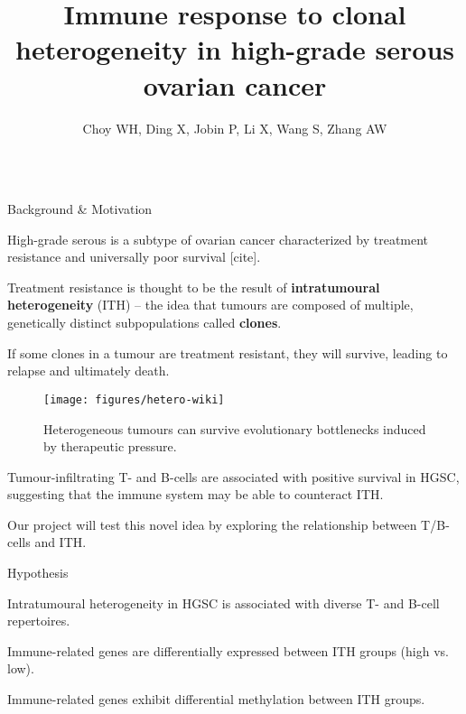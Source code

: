 \documentclass[serif,mathserif,final,dvipsnames]{beamer}
\title{Immune response to clonal heterogeneity in high-grade serous ovarian cancer}
\author{Choy WH, Ding X, Jobin P, Li X, Wang S, Zhang AW}
\institute{University of British Columbia, Vancouver, Canada}
\begin{document}
\begin{frame}{}
  \begin{columns}[t]

    \begin{column}{0.32\linewidth}

      \begin{myblock}{Background \& Motivation}
      
      \begin{wideitemize}
      \item High-grade serous is a subtype of ovarian cancer characterized by treatment resistance and universally poor survival [cite].  
      \item Treatment resistance is thought to be the result of \textbf{intratumoural heterogeneity} (ITH) -- the idea that tumours are composed of multiple, genetically distinct subpopulations called \textbf{clones}. 
      \item If some clones in a tumour are treatment resistant, they will survive, leading to relapse and ultimately death. 
      \begin{figure}
      \centering
      \texttt{[image: figures/hetero-wiki]} 
      \caption{Heterogeneous tumours can survive evolutionary bottlenecks induced by therapeutic pressure.}\label{fig:1}
      \end{figure}
      \item Tumour-infiltrating T- and B-cells are associated with positive survival in HGSC, suggesting that the immune system may be able to counteract ITH. 
     \item Our project will test this novel idea by exploring the relationship between T/B-cells and ITH. 
      \end{wideitemize}
      \end{myblock}

      \begin{myblock}{Hypothesis}
        \begin{wideitemize}
        \item Intratumoural heterogeneity in HGSC is associated with diverse T- and B-cell repertoires. 
        \item Immune-related genes are differentially expressed between ITH groups (high vs. low).  
        \item Immune-related genes exhibit differential methylation between ITH groups.
        \end{wideitemize}
      \end{myblock}


\end{column}
\end{columns}
\end{frame}
\end{document}

